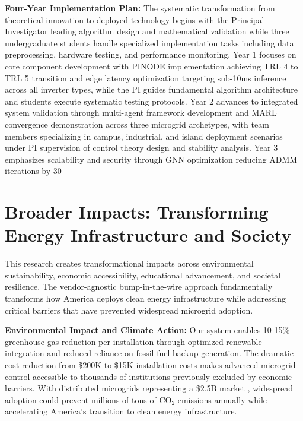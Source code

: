 \documentclass[12pt]{article}
\begin{document}
\textbf{Four-Year Implementation Plan:} The systematic transformation from theoretical innovation to deployed technology begins with the Principal Investigator leading algorithm design and mathematical validation while three undergraduate students handle specialized implementation tasks including data preprocessing, hardware testing, and performance monitoring. Year 1 focuses on core component development with PINODE implementation achieving TRL 4 to TRL 5 transition and edge latency optimization targeting sub-10ms inference across all inverter types, while the PI guides fundamental algorithm architecture and students execute systematic testing protocols. Year 2 advances to integrated system validation through multi-agent framework development and MARL convergence demonstration across three microgrid archetypes, with team members specializing in campus, industrial, and island deployment scenarios under PI supervision of control theory design and stability analysis. Year 3 emphasizes scalability and security through GNN optimization reducing ADMM iterations by 30%



\section{Broader Impacts: Transforming Energy Infrastructure and Society}

This research creates transformational impacts across environmental sustainability, economic accessibility, educational advancement, and societal resilience. The vendor-agnostic bump-in-the-wire approach fundamentally transforms how America deploys clean energy infrastructure while addressing critical barriers that have prevented widespread microgrid adoption.

\textbf{Environmental Impact and Climate Action:} Our system enables 10-15\% greenhouse gas reduction per installation through optimized renewable integration and reduced reliance on fossil fuel backup generation. The dramatic cost reduction from \$200K to \$15K installation costs \cite{our2024economic} makes advanced microgrid control accessible to thousands of institutions previously excluded by economic barriers. With distributed microgrids representing a \$2.5B market \cite{our2024economic}, widespread adoption could prevent millions of tons of CO$_2$ emissions annually while accelerating America's transition to clean energy infrastructure.
\end{document}
